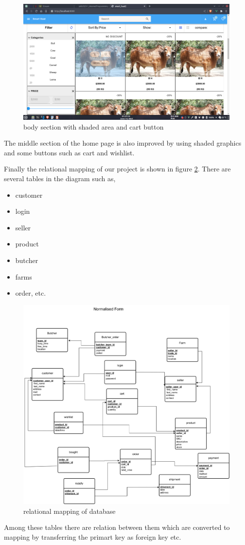 \documentclass[a4paper,12pt]{report}
\begin{document}
\begin{figure}[H]
	\includegraphics[keepaspectratio, width=\linewidth]{body.png}
	\caption{body section with shaded area and cart button}
	\label{body}
\end{figure}
The middle section of the home page is also improved by using shaded graphics and some buttons such as cart and wishlist.



Finally the relational mapping of our project is shown in figure \ref{mapping}. There are several tables in the diagram such as, 
\begin{itemize}
	\item customer
	\item login
	\item seller
	\item product
	\item butcher
	\item farms
	\item order, etc.
\end{itemize}
\begin{figure}
	\includegraphics[keepaspectratio, width=\linewidth]{smartHattdbmapping.png}
	\caption{relational mapping of database}
	\label{mapping}
\end{figure}
 Among these tables there are relation between them which are converted to mapping by transferring the primart key as foreign key etc.
\end{document}
